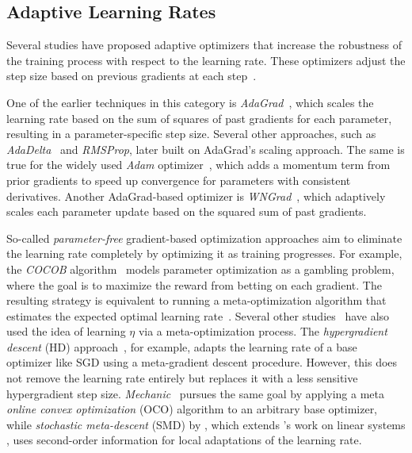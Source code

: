 \documentclass{article} %
\begin{document}
\subsection{Adaptive Learning Rates}

Several studies have proposed adaptive optimizers that increase the robustness of the training process with respect to the learning rate.
These optimizers adjust the step size based on previous gradients at each step~\citep{duchiAdaptiveSubgradientMethods2011}.

One of the earlier techniques in this category is \textit{AdaGrad}~\citep{duchiAdaptiveSubgradientMethods2011}, which scales the learning rate based on the sum of squares of past gradients for each parameter, resulting in a parameter-specific step size.
Several other approaches, such as \textit{AdaDelta}~\citep{zeilerADADELTAAdaptiveLearning2012a} and \textit{RMSProp}, later built on AdaGrad's scaling approach.
The same is true for the widely used \textit{Adam} optimizer~\citep{kingmaAdamMethodStochastic2017b}, which adds a momentum term from prior gradients to speed up convergence for parameters with consistent derivatives.
Another AdaGrad-based optimizer is \textit{WNGrad}~\citep{wuWNGradLearnLearning2020}, which adaptively scales each parameter update based on the squared sum of past gradients.

So-called \textit{parameter-free} gradient-based optimization approaches aim to eliminate the learning rate completely by optimizing it as training progresses.
For example, the \textit{COCOB} algorithm~\citep{orabonaTrainingDeepNetworks2017} models parameter optimization as a gambling problem, where the goal is to maximize the reward from betting on each gradient.
The resulting strategy is equivalent to running a meta-optimization algorithm that estimates the expected optimal learning rate~\citep{orabonaTrainingDeepNetworks2017}.
Several other studies~\citep{schraudolphLocalGainAdaptation1999,vanervenMetaGradMultipleLearning2016a,baydinOnlineLearningRate2018,cutkoskyMechanicLearningRate2023} have also used the idea of learning $\eta$ via a meta-optimization process.
The \textit{hypergradient descent} (HD) approach~\citep{baydinOnlineLearningRate2018}, for example, adapts the learning rate of a base optimizer like SGD using a meta-gradient descent procedure.
However, this does not remove the learning rate entirely but replaces it with a less sensitive hypergradient step size.
\textit{Mechanic}~\citep{cutkoskyMechanicLearningRate2023} pursues the same goal by applying a meta \textit{online convex optimization} (OCO) algorithm to an arbitrary base optimizer, while \textit{stochastic meta-descent} (SMD) by \citet{schraudolphLocalGainAdaptation1999}, which extends \citeauthor{suttonAdaptingBiasGradient1992}'s work on linear systems \citep{suttonAdaptingBiasGradient1992}, uses second-order information for local adaptations of the learning rate.
\end{document}
